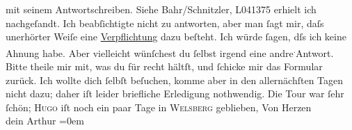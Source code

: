 \begin{ledgroupsized}[t]{13cm}
{{{                  mit seinem Antwortschreiben. Siehe Bahr/Schnitzler, L041375}}}\label{K_L01229-1h} erhielt ich nachgeſandt. Ich beabſichtigte nicht zu
               antworten, aber man ſagt mir, daſs unerhörter Weiſe eine \uline{Verpflichtung} dazu beſteht. Ich würde ſagen, dſs ich keine Ahnung habe. Aber
               vielleicht wünſchest du ſelbst irgend eine andre\substVorne{}\textsuperscript{.}\substDazwischen{}{ }Antwort.\substHinten{} Bitte theile mir mit, was {\pb}du für recht  hältſt,
               und ſchicke mir das Formular zurück.\pend
           \pstart
           Ich wollte dich ſelbſt beſuchen, komme aber in den allernächſten Tagen nicht dazu;
               daher iſt leider briefliche Erledigung nothwendig.\pend
           \pstart
           Die Tour war ſehr ſchön; \textsc{Hugo} iſt noch ein paar Tage in \textsc{Welsberg} geblieben,\pend
           \pstart
           Von Herzen{\\[\baselineskip]}dein \spacefill\mbox{Arthur}\pend
           \leftskip=0em{}
         
         \endnumbering{}\end{ledgroupsized}  \newcommand{\dateiname}{L01229}\newcommand{\titel}{Arthur Schnitzler an Hermann Bahr, [9. 7. 1902]}\newcommand{\editorInnen}{ Kurt Ifkovits,  Martin Anton Müller}
      
